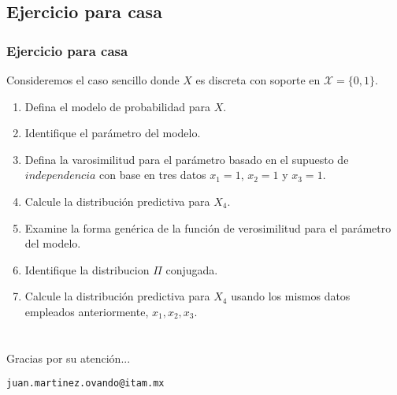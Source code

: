 \documentclass[cjk,t,compress]{beamer}
\begin{document}
	\subsection{Ejercicio para casa}
	\frame
	{
    \frametitle{Ejercicio para casa}
  		{\scriptsize  	
		Consideremos el caso sencillo donde $X$ es discreta con soporte en $\mathcal{X}=\{0,1\}$.
		\begin{enumerate}
		  \item Defina el modelo de probabilidad para $X$. 
		  \item Identifique el par\'ametro del modelo.
		  \item Defina la varosimilitud para el par\'ametro basado en el supuesto de $independencia$ con base en tres datos $x_1=1$, $x_2=1$ y $x_3=1$.
		  \item Calcule la distribuci\'on predictiva para $X_4$.
		  \item Examine la forma gen\'erica de la funci\'on de verosimilitud para el par\'ametro del modelo.
		  \item Identifique la distribucion $\Pi$ conjugada.
		  \item Calcule la distribuci\'on predictiva para $X_4$ usando los mismos datos empleados anteriormente, $x_1,x_2,x_3$.
		\end{enumerate}
		}
	}

\section*{ }
\frame
{\scriptsize
	\begin{center}
		\textcolor{MyDarkOrange}{\huge }
		
		\vspace{1.7cm}
		\textcolor{MyDarkBlue}{\Large Gracias por su atenci\'on...}
		
		\vspace{1.3cm}
		\textcolor{MyDarkGreen}{\large \tt juan.martinez.ovando@itam.mx}
		
	\end{center}
}
\end{document}
